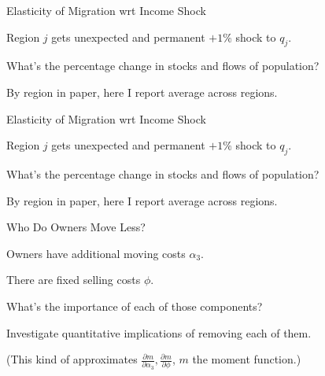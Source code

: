 \documentclass[12pt,english, aspectratio=169]{beamer}
\begin{document}
\begin{frame}{Elasticity of Migration wrt Income Shock}

\begin{midi}
\item Region $j$ gets unexpected and permanent $+1\%$ shock to $q_j$.
\item What's the percentage change in stocks and flows of population?
\item By region in paper, here I report average across regions.
\end{midi}

\vspace{0.5cm}
\begin{adjustbox}{center}

\end{adjustbox}
\end{frame}

\begin{frame}{Elasticity of Migration wrt Income Shock}

\begin{midi}
\item Region $j$ gets unexpected and permanent $+1\%$ shock to $q_j$.
\item What's the percentage change in stocks and flows of population?
\item By region in paper, here I report average across regions.
\end{midi}

\vspace{0.5cm}
\begin{adjustbox}{center}

\end{adjustbox}
\end{frame}

\begin{frame}{Who Do Owners Move Less?}

\begin{midi}
\item Owners have additional moving costs $\alpha_3$.
\item There are fixed selling costs $\phi$.
\pause
\item What's the importance of each of those components?
\item Investigate quantitative implications of removing each of them.
\pause
\item (This kind of approximates $\frac{\partial m}{\partial \alpha_3},\frac{\partial m}{\partial \phi}$, $m$ the moment function.)
\end{midi}

\end{frame}
\end{document}
